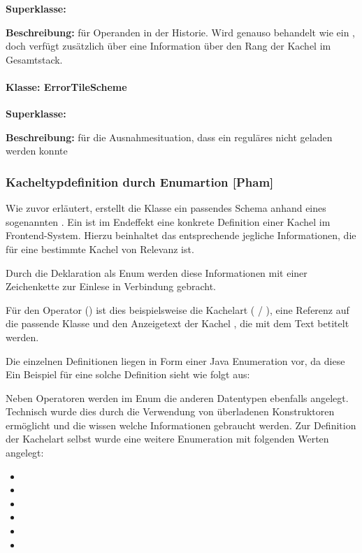 \textbf{Superklasse:} 

\textbf{Beschreibung: } für Operanden in der Historie. Wird genauso behandelt wie ein , doch verfügt zusätzlich über eine Information über den Rang der Kachel im Gesamtstack.

\paragraph{Klasse: ErrorTileScheme}

\textbf{Superklasse:} 

\textbf{Beschreibung: } für die Ausnahmesituation, dass ein reguläres  nicht geladen werden konnte

\subsubsection{Kacheltypdefinition durch Enumartion [Pham]}

Wie zuvor erläutert, erstellt die Klasse  ein passendes Schema anhand eines sogenannten . Ein  ist im Endeffekt eine konkrete Definition einer Kachel im Frontend-System. Hierzu beinhaltet das entsprechende  jegliche Informationen, die für eine bestimmte Kachel von Relevanz ist. 

Durch die Deklaration als Enum werden diese Informationen mit einer Zeichenkette zur Einlese in Verbindung gebracht. 

Für den Operator \code{-} () ist dies beispielsweise die Kachelart ( / ), eine Referenz auf die passende  Klasse und den Anzeigetext der Kachel \code{-}, die mit dem Text  betitelt werden. 

Die einzelnen Definitionen liegen in Form einer Java Enumeration vor, da diese Ein Beispiel für eine solche Definition sieht wie folgt aus:


Neben Operatoren werden im Enum die anderen Datentypen ebenfalls angelegt. Technisch wurde dies durch die Verwendung von überladenen Konstruktoren ermöglicht und die  wissen welche Informationen gebraucht werden. Zur Definition der Kachelart selbst wurde eine weitere Enumeration mit folgenden Werten angelegt:

\begin{itemize}
	\item {}
	\item {}
	\item {}
	\item {}
	\item {}
	\item {}
\end{itemize}

